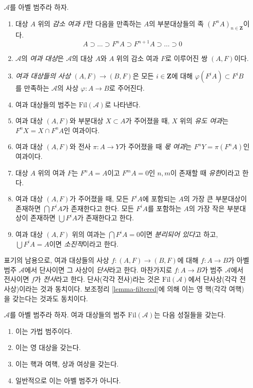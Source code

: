 \begin{definition}
\label{definition-filtered}
$\mathcal{A}$를 아벨 범주라 하자.
\begin{enumerate}
\item 대상 $A$ 위의 {\it 감소 여과} $F$란 다음을 만족하는 $A$의
부분대상들의 족 $(F^nA)_{n \in \mathbf{Z}}$이다.
$$
A \supset \ldots \supset F^nA \supset F^{n + 1}A \supset \ldots \supset 0
$$
\item $\mathcal{A}$의 {\it 여과 대상}은 $\mathcal{A}$의 대상 $A$와
$A$ 위의 감소 여과 $F$로 이루어진 쌍 $(A, F)$이다.
\item {\it 여과 대상들의 사상 $(A, F) \to (B, F)$}은 모든
$i \in \mathbf{Z}$에 대해 $\varphi(F^iA) \subset F^iB$를 만족하는
$\mathcal{A}$의 사상 $\varphi : A \to B$로 주어진다.
\item 여과 대상들의 범주는 $\text{Fil}(\mathcal{A})$로 나타낸다.
\item 여과 대상 $(A, F)$와 부분대상 $X \subset A$가 주어졌을 때,
$X$ 위의 {\it 유도 여과}는 $F^nX = X \cap F^nA$인 여과이다.
\item 여과 대상 $(A, F)$와 전사
$\pi : A \to Y$가 주어졌을 때 {\it 몫 여과}는
$F^nY = \pi(F^nA)$인 여과이다.
\item 대상 $A$ 위의 여과 $F$는 $F^nA = A$이고 $F^mA = 0$인
$n, m$이 존재할 때 {\it 유한}이라고 한다.
\item 여과 대상 $(A, F)$가 주어졌을 때, 모든 $F^iA$에 포함되는
$A$의 가장 큰 부분대상이 존재하면 $\bigcap F^iA$가 존재한다고 한다.
모든 $F^iA$를 포함하는 $A$의 가장 작은 부분대상이 존재하면
$\bigcup F^iA$가 존재한다고 한다.
\item 여과 대상 $(A, F)$ 위의 여과는 $\bigcap F^iA = 0$이면
{\it 분리되어 있다}고 하고, $\bigcup F^iA = A$이면
{\it 소진적}이라고 한다.
\end{enumerate}
\end{definition}

\noindent
표기의 남용으로, 여과 대상들의 사상 $f : (A, F) \to (B, F)$에 대해
$f : A \to B$가 아벨 범주 $\mathcal{A}$에서 단사이면 그 사상이
{\it 단사}라고 한다. 마찬가지로 $f : A \to B$가 범주
$\mathcal{A}$에서 전사이면 $f$가 {\it 전사}라고 한다. 단사(각각 전사)라는
것은 $\text{Fil}(\mathcal{A})$에서 단사상(각각 전사상)이라는 것과
동치이다. 보조정리 \ref{lemma-filtered}에 의해 이는 영 핵(각각 여핵)을
갖는다는 것과도 동치이다.

\begin{lemma}
\label{lemma-filtered}
$\mathcal{A}$를 아벨 범주라 하자. 여과 대상들의 범주
$\text{Fil}(\mathcal{A})$는 다음 성질들을 갖는다.
\begin{enumerate}
\item 이는 가법 범주이다.
\item 이는 영 대상을 갖는다.
\item 이는 핵과 여핵, 상과 여상을 갖는다.
\item 일반적으로 이는 아벨 범주가 아니다.
\end{enumerate}
\end{lemma}

